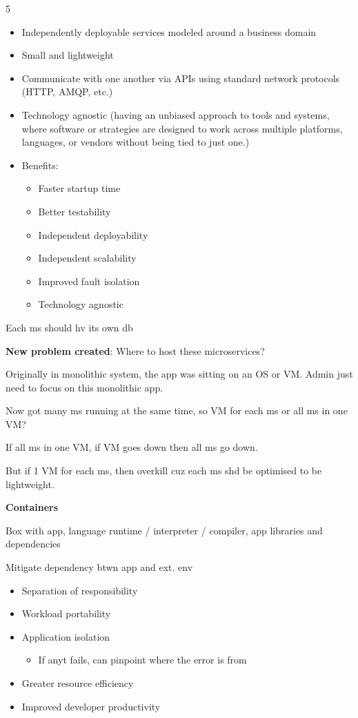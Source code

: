 \documentclass[landscape,a4paper]{extarticle}
\begin{document}
\begin{multicols*}{5}
    \begin{itemize}
        \item Independently deployable services modeled around a business domain
        \item Small and lightweight
        \item Communicate with one another via APIs using standard network protocols (HTTP, AMQP, etc.)
        \item Technology agnostic (having an unbiased approach to tools and systems, where software or strategies are designed to work across multiple platforms, languages, or vendors without being tied to just one.)
        \item Benefits:
        \begin{itemize}
            \item Faster startup time
            \item Better testability
            \item Independent deployability
            \item Independent scalability
            \item Improved fault isolation
            \item Technology agnostic
        \end{itemize}
    \end{itemize}

    Each ms should hv its own db

    \textbf{New problem created}: Where to host these microservices?

    Originally in monolithic system, the app was sitting on an OS or VM. Admin just need to focus on this monolithic app.

    Now got many ms running at the same time, so VM for each ms or all ms in one VM?

    If all ms in one VM, if VM goes down then all ms go down. 

    But if 1 VM for each ms, then overkill cuz each ms shd be optimised to be lightweight.

    \textbf{Containers}

    Box with app, language runtime / interpreter / compiler, app libraries and dependencies

    Mitigate dependency btwn app and ext. env

    \begin{itemize}
        \item Separation of responsibility
        \item Workload portability
        \item Application isolation
        \begin{itemize}
            \item If anyt fails, can pinpoint where the error is from
        \end{itemize}
        \item Greater resource efficiency
        \item Improved developer productivity
    \end{itemize}


\end{multicols*}
\end{document}

